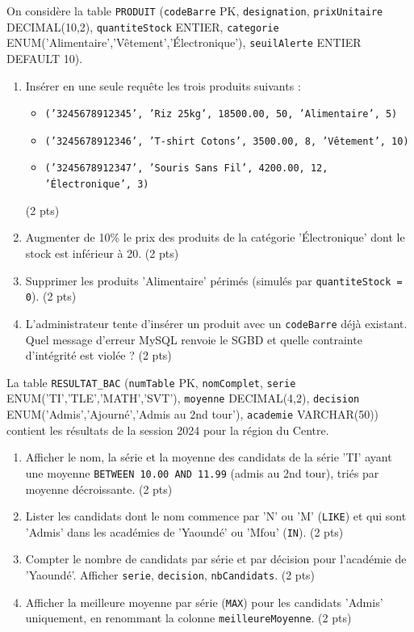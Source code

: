 \documentclass[11pt]{article}
\begin{document}
\begin{exercice}
On considère la table \texttt{PRODUIT} (\texttt{codeBarre} PK, \texttt{designation}, \texttt{prixUnitaire} DECIMAL(10,2), \texttt{quantiteStock} ENTIER, \texttt{categorie} ENUM('Alimentaire','Vêtement','Électronique'), \texttt{seuilAlerte} ENTIER DEFAULT 10).
\begin{enumerate}
    \item Insérer en une seule requête les trois produits suivants :
    \begin{itemize}
        \item \texttt{('3245678912345', 'Riz 25kg', 18500.00, 50, 'Alimentaire', 5)}
        \item \texttt{('3245678912346', 'T-shirt Cotons', 3500.00, 8, 'Vêtement', 10)}
        \item \texttt{('3245678912347', 'Souris Sans Fil', 4200.00, 12, 'Électronique', 3)}
    \end{itemize}
    \hfill (2 pts)
    \item Augmenter de 10\% le prix des produits de la catégorie 'Électronique' dont le stock est inférieur à 20. \hfill (2 pts)
    \item Supprimer les produits 'Alimentaire' périmés (simulés par \texttt{quantiteStock = 0}). \hfill (2 pts)
    \item L'administrateur tente d'insérer un produit avec un \texttt{codeBarre} déjà existant. Quel message d'erreur MySQL renvoie le SGBD et quelle contrainte d'intégrité est violée ? \hfill (2 pts)
\end{enumerate}
\end{exercice}

\begin{exercice}
La table \texttt{RESULTAT\_BAC} (\texttt{numTable} PK, \texttt{nomComplet}, \texttt{serie} ENUM('TI','TLE','MATH','SVT'), \texttt{moyenne} DECIMAL(4,2), \texttt{decision} ENUM('Admis','Ajourné','Admis au 2nd tour'), \texttt{academie} VARCHAR(50)) contient les résultats de la session 2024 pour la région du Centre.
\begin{enumerate}
    \item Afficher le nom, la série et la moyenne des candidats de la série 'TI' ayant une moyenne \texttt{BETWEEN 10.00 AND 11.99} (admis au 2nd tour), triés par moyenne décroissante. \hfill (2 pts)
    \item Lister les candidats dont le nom commence par 'N' ou 'M' (\texttt{LIKE}) et qui sont 'Admis' dans les académies de 'Yaoundé' ou 'Mfou' (\texttt{IN}). \hfill (2 pts)
    \item Compter le nombre de candidats par série et par décision pour l'académie de 'Yaoundé'. Afficher \texttt{serie}, \texttt{decision}, \texttt{nbCandidats}. \hfill (2 pts)
    \item Afficher la meilleure moyenne par série (\texttt{MAX}) pour les candidats 'Admis' uniquement, en renommant la colonne \texttt{meilleureMoyenne}. \hfill (2 pts)
\end{enumerate}
\end{exercice}
\end{document}
